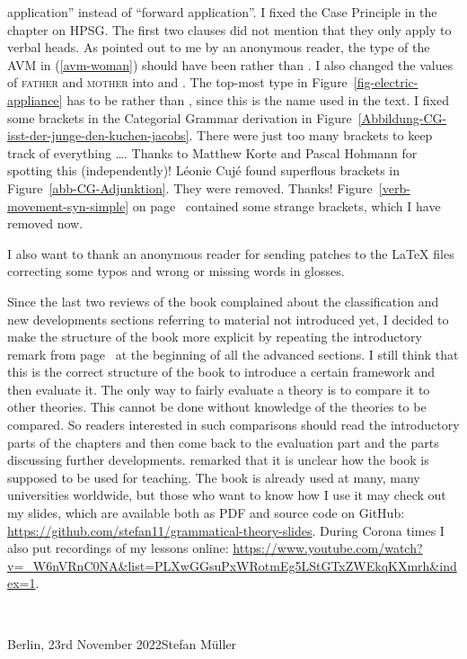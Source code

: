 application'' instead of ``forward application''.
I fixed the Case Principle in the chapter on HPSG. The first two clauses did not mention that they
only apply to verbal heads.
%
As pointed out to me by an anonymous reader, the type of the AVM in (\ref{avm-woman}) should have
been  rather than . I also changed the values of \textsc{father} and \textsc{mother}
into  and . The top-most type in Figure~\ref{fig-electric-appliance} has to be
 rather than , since this is the name used in the
text.
%
I fixed some brackets in the Categorial Grammar derivation in Figure~\ref{Abbildung-CG-isst-der-junge-den-kuchen-jacobs}. There were
just too many brackets to keep track of everything \ldots. Thanks to Matthew Korte and Pascal
Hohmann for spotting this (independently)!
Léonie Cujé found superflous brackets in Figure~\ref{abb-CG-Adjunktion}. They were removed. Thanks!
%
Figure~\ref{verb-movement-syn-simple} on page~\pageref{verb-movement-syn-simple} contained some
strange brackets, which I have removed now.

I also want to thank an anonymous reader for sending patches to the \LaTeX{} files correcting some
typos and wrong or missing words in glosses.

Since the last two reviews of the book complained about the classification and new developments
sections referring to material not introduced yet, I decided to make the structure of the book more
explicit by repeating the introductory remark from page~\pageref{page:structure-of-book} at the
beginning of all the advanced sections. I still think that this is the correct structure of the book to introduce a
certain framework and then evaluate it. The only way to fairly evaluate a theory is to compare it to
other theories. This cannot be done without knowledge of the theories to be compared. So readers
interested in such comparisons should read the introductory parts of the chapters and then come back
to the evaluation part and the parts discussing further developments. \citet{Culicover2021a}
remarked that it is unclear how the book is supposed to be used for teaching. The book is already
used at many, many universities worldwide, but those who want to know how I use it may check out my
slides, which are available both as PDF and source code on GitHub:
\url{https://github.com/stefan11/grammatical-theory-slides}. During Corona times I also put
recordings of my lessons online: \url{https://www.youtube.com/watch?v=_W6nVRnC0NA&list=PLXwGGsuPxWRotmEg5LStGTxZWEkqKXmrh&index=1}.

~\medskip

\noindent
Berlin, 23rd November 2022\hfill Stefan Müller



